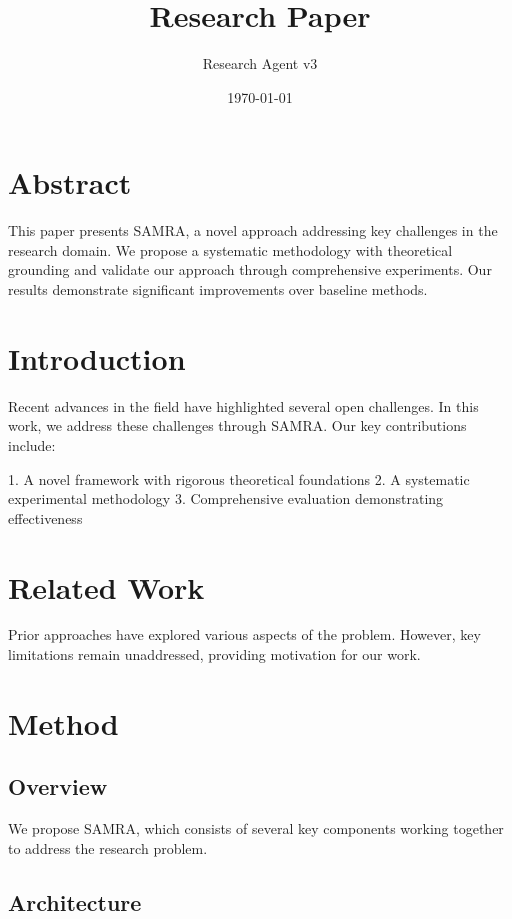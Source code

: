 \documentclass[11pt,a4paper]{article}
\title{Research Paper}
\author{Research Agent v3}
\date{\today}
\begin{document}
\maketitle


\section{Abstract}

This paper presents SAMRA, a novel approach addressing key challenges in the research domain. We propose a systematic methodology with theoretical grounding and validate our approach through comprehensive experiments. Our results demonstrate significant improvements over baseline methods.

\section{Introduction}

Recent advances in the field have highlighted several open challenges. In this work, we address these challenges through SAMRA. Our key contributions include:

1. A novel framework with rigorous theoretical foundations
2. A systematic experimental methodology
3. Comprehensive evaluation demonstrating effectiveness

\section{Related Work}

Prior approaches have explored various aspects of the problem. However, key limitations remain unaddressed, providing motivation for our work.

\section{Method}

\subsection{Overview}

We propose SAMRA, which consists of several key components working together to address the research problem.

\subsection{Architecture}
\end{document}
